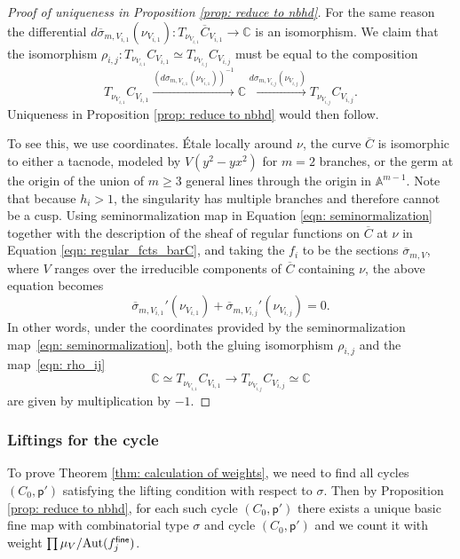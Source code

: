 \documentclass{article}
\def\C{\mathbb{C}}
\def\Aut{{\rm Aut}}
\newcommand{\fine}{\mathsf{fine}}
\begin{document}
\begin{proof}[Proof of uniqueness in Proposition \ref{prop: reduce to nbhd}]
For the same reason the differential $d\overline{\sigma}_{m,V_{i,1}}(\nu_{V_{i,1}})\colon T_{\nu_{V_{i,1}}}\overline{C}_{V_{i,1}} \to \C$
is an isomorphism. We claim that the isomorphism $\rho_{i,j}: T_{\nu_{V_{i,1}}}C_{V_{i,1}} \simeq T_{\nu_{V_{i,j}}}C_{V_{i,j}}$ must be equal to the composition 
\begin{equation}\label{eqn: rho_ij}
T_{\nu_{V_{i,1}}}C_{V_{i,1}} \xrightarrow{(d\sigma_{m,V_{i,1}}(\nu_{V_{i,1}}))^{-1} } \C\xrightarrow{d\sigma_{m,V_{i,j}}(\nu_{V_{i,j }})} T_{\nu_{V_{i,j}}}C_{V_{i,j}}.
\end{equation}
Uniqueness in Proposition \ref{prop: reduce to nbhd} would then follow.

To see this, we use coordinates. Étale locally around $\nu$, the curve $\overline{C}$ is isomorphic to either a tacnode, modeled by $V(y^2-yx^2)$ for $m=2$ branches, or the germ at the origin of the union of $m \geq 3$ general lines through the origin in $\mathbb{A}^{m-1}$. Note that because $h_i > 1$, the singularity has multiple branches and therefore cannot be a cusp. Using seminormalization map in Equation \eqref{eqn: seminormalization} together with the description of the sheaf of regular functions on $\overline{C}$ at $\nu$ in Equation \eqref{eqn: regular_fcts_barC}, and taking the $f_i$ to be the sections $\overline{\sigma}_{m,V}$, where $V$ ranges over the irreducible components of $\overline{C}$ containing $\nu$, the above equation becomes
\[
\overline{\sigma}_{m,V_{i,1}}'(\nu_{V_{i,1}})
+
\overline{\sigma}_{m,V_{i,j}}'(\nu_{V_{i,j}})
=0.
\]
In other words, under the coordinates provided by the seminormalization map~\eqref{eqn: seminormalization}, both the gluing isomorphism $\rho_{i,j}$ and the map~\eqref{eqn: rho_ij}
\[
\mathbb{C}
\simeq
T_{\nu_{V_{i,1}}}C_{V_{i,1}}
\longrightarrow
T_{\nu_{V_{i,j}}}C_{V_{i,j}}
\simeq
\mathbb{C}
\]
are given by multiplication by $-1$.


\end{proof}


\subsubsection{Liftings for the cycle} \label{sec: liftings for the cycle}


To prove Theorem \ref{thm: calculation of weights}, we need to find all cycles $(C_0, \mathsf{p}')$ satisfying the lifting condition with respect to $\sigma$. Then by Proposition \ref{prop: reduce to nbhd}, for each such cycle $(C_0, \mathsf{p}')$ there exists a unique basic fine map with combinatorial type $\sigma$ and cycle $(C_0,\mathsf{p}')$ and we count it with weight $\prod \mu_V/\Aut(f_j^\fine)$. 
\end{document}

